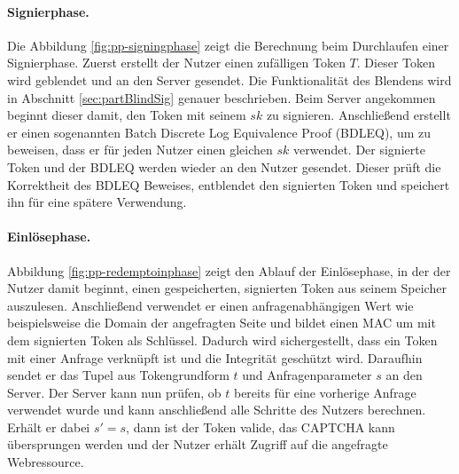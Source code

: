 \documentclass[
	fontsize=11pt,
	headings=small,
	parskip=half,           %
	bibliography=totoc,
	numbers=noenddot,       %
	open=any,               %
]{scrreprt}
\begin{document}
\paragraph{Signierphase.}
Die Abbildung \ref{fig:pp-signingphase} zeigt die Berechnung beim Durchlaufen einer Signierphase. Zuerst erstellt der Nutzer einen zufälligen Token $T$. Dieser Token wird geblendet und an den Server gesendet. Die Funktionalität des Blendens wird in Abschnitt \ref{sec:partBlindSig} genauer beschrieben. Beim Server angekommen beginnt dieser damit, den Token mit seinem $sk$ zu signieren. Anschließend erstellt er einen sogenannten Batch Discrete Log Equivalence Proof (BDLEQ), um zu beweisen, dass er für jeden Nutzer einen gleichen $sk$ verwendet. Der signierte Token und der BDLEQ werden wieder an den Nutzer gesendet. Dieser prüft die Korrektheit des BDLEQ Beweises, entblendet den signierten Token und speichert ihn für eine spätere Verwendung. 

\paragraph{Einlösephase.}
Abbildung \ref{fig:pp-redemptoinphase} zeigt den Ablauf der Einlösephase, in der der Nutzer damit beginnt, einen gespeicherten, signierten Token aus seinem Speicher auszulesen. Anschließend verwendet er einen anfragenabhängigen Wert wie beispielsweise die Domain der angefragten Seite und bildet einen MAC um mit dem signierten Token als Schlüssel. Dadurch wird sichergestellt, dass ein Token mit einer Anfrage verknüpft ist und die Integrität geschützt wird. Daraufhin sendet er das Tupel aus Tokengrundform $t$ und Anfragenparameter $s$ an den Server. Der Server kann nun prüfen, ob $t$ bereits für eine vorherige Anfrage verwendet wurde und kann anschließend alle Schritte des Nutzers berechnen. Erhält er dabei $s'=s$, dann ist der Token valide, das CAPTCHA kann übersprungen werden und der Nutzer erhält Zugriff auf die angefragte Webressource.
\end{document}
